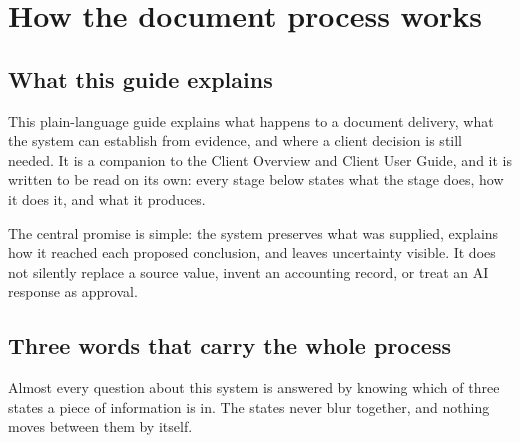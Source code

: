 \documentclass[
]{article}
\author{}
\date{}
\begin{document}
\section{How the document process
works}\label{how-the-document-process-works}

\subsection{What this guide explains}\label{what-this-guide-explains}

This plain-language guide explains what happens to a document delivery,
what the system can establish from evidence, and where a client decision
is still needed. It is a companion to the Client Overview and Client
User Guide, and it is written to be read on its own: every stage below
states what the stage does, how it does it, and what it produces.

The central promise is simple: the system preserves what was supplied,
explains how it reached each proposed conclusion, and leaves uncertainty
visible. It does not silently replace a source value, invent an
accounting record, or treat an AI response as approval.

\subsection{Three words that carry the whole
process}\label{three-words-that-carry-the-whole-process}

Almost every question about this system is answered by knowing which of
three states a piece of information is in. The states never blur
together, and nothing moves between them by itself.
\end{document}
